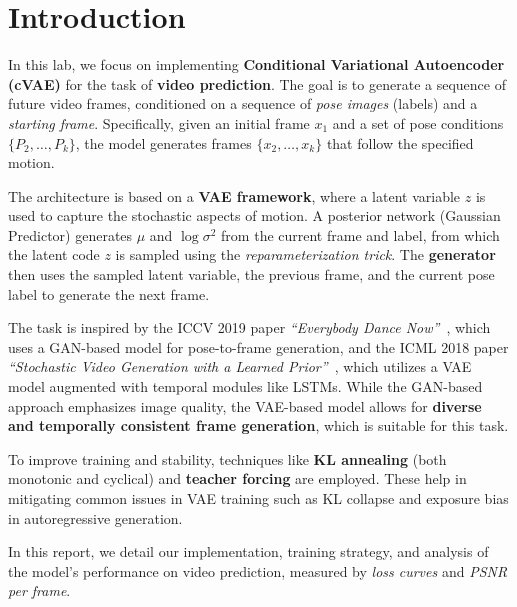 \section{Introduction}
\label{sec:intro}

In this lab, we focus on implementing \textbf{Conditional Variational Autoencoder (cVAE)} for the task of \textbf{video prediction}. The goal is to generate a sequence of future video frames, conditioned on a sequence of \textit{pose images} (labels) and a \textit{starting frame}. Specifically, given an initial frame $x_1$ and a set of pose conditions $\{P_2, \ldots, P_k\}$, the model generates frames $\{x_2, \ldots, x_k\}$ that follow the specified motion.

The architecture is based on a \textbf{VAE framework}, where a latent variable $z$ is used to capture the stochastic aspects of motion. A posterior network (Gaussian Predictor) generates $\mu$ and $\log \sigma^2$ from the current frame and label, from which the latent code $z$ is sampled using the \textit{reparameterization trick}. The \textbf{generator} then uses the sampled latent variable, the previous frame, and the current pose label to generate the next frame.

The task is inspired by the ICCV 2019 paper \textit{``Everybody Dance Now''}~\cite{chan2019everybody}, which uses a GAN-based model for pose-to-frame generation, and the ICML 2018 paper \textit{``Stochastic Video Generation with a Learned Prior''}~\cite{denton2018stochastic}, which utilizes a VAE model augmented with temporal modules like LSTMs. While the GAN-based approach emphasizes image quality, the VAE-based model allows for \textbf{diverse and temporally consistent frame generation}, which is suitable for this task.

To improve training and stability, techniques like \textbf{KL annealing} (both monotonic and cyclical) and \textbf{teacher forcing} are employed. These help in mitigating common issues in VAE training such as KL collapse and exposure bias in autoregressive generation.

In this report, we detail our implementation, training strategy, and analysis of the model's performance on video prediction, measured by \textit{loss curves} and \textit{PSNR per frame}.
